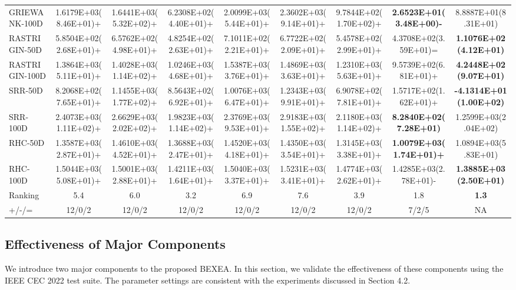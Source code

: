 \documentclass[review]{elsarticle}
\begin{document}
\begin{table}
{\begin{tabular}{lcccccccc}
GRIEWANK-100D & 1.6179E+03(8.46E+01)+ & 1.6441E+03(5.32E+02)+ & 6.2308E+02(4.40E+01)+ & 2.0099E+03(5.44E+01)+ & 2.3602E+03(9.14E+01)+ & 9.7844E+02(1.70E+02)+ & \textbf{2.6523E+01(3.48E+00)-} & 8.8887E+01(8.31E+01) \\
RASTRIGIN-50D & 5.8504E+02(2.68E+01)+ & 6.5762E+02(4.98E+01)+ & 4.8254E+02(2.63E+01)+ & 7.1011E+02(2.21E+01)+ & 6.7722E+02(2.09E+01)+ & 5.4578E+02(2.99E+01)+ & 4.3708E+02(3.59E+01)= & \textbf{1.1076E+02(4.12E+01)} \\
RASTRIGIN-100D & 1.3864E+03(5.11E+01)+ & 1.4028E+03(1.14E+02)+ & 1.0246E+03(4.68E+01)+ & 1.5387E+03(3.76E+01)+ & 1.4869E+03(3.63E+01)+ & 1.2310E+03(5.63E+01)+ & 9.5739E+02(6.81E+01)+ & \textbf{4.2448E+02(9.07E+01)} \\
SRR-50D & 8.2068E+02(7.65E+01)+ & 1.1455E+03(1.77E+02)+ & 8.5643E+02(6.92E+01)+ & 1.0076E+03(6.47E+01)+ & 1.2343E+03(9.91E+01)+ & 6.9078E+02(7.81E+01)+ & 1.5717E+02(1.62E+01)+ & \textbf{-4.1314E+01(1.00E+02)} \\
SRR-100D & 2.4073E+03(1.11E+02)+ & 2.6629E+03(2.02E+02)+ & 1.9823E+03(1.14E+02)+ & 2.3769E+03(9.53E+01)+ & 2.9183E+03(1.55E+02)+ & 2.1180E+03(1.14E+02)+ & \textbf{8.2840E+02(7.28E+01)} & 1.2599E+03(2.04E+02) \\
RHC-50D & 1.3587E+03(2.87E+01)+ & 1.4610E+03(4.52E+01)+ & 1.3688E+03(2.47E+01)+ & 1.4520E+03(4.18E+01)+ & 1.4350E+03(3.54E+01)+ & 1.3145E+03(3.38E+01)+ & \textbf{1.0079E+03(1.74E+01)+} & 1.0894E+03(5.83E+01) \\
RHC-100D & 1.5044E+03(5.08E+01)+ & 1.5001E+03(2.88E+01)+ & 1.4211E+03(1.64E+01)+ & 1.5040E+03(3.37E+01)+ & 1.5231E+03(3.41E+01)+ & 1.4774E+03(2.62E+01)+ & 1.4285E+03(2.78E+01)- & \textbf{1.3885E+03(2.50E+01)} \\
Ranking & 5.4 & 6.0 & 3.2 & 6.9 & 7.6 & 3.9 & 1.8 & \textbf{1.3} \\
+/-/= & 12/0/2 & 12/0/2 & 12/0/2 & 12/0/2 & 12/0/2 & 12/0/2 & 7/2/5 & NA \\
\bottomrule
\end{tabular}}
\end{table}

\subsection{Effectiveness of Major Components}
We introduce two major components to the proposed BEXEA. In this section, we validate the effectiveness of these components using the IEEE CEC 2022 test suite. The parameter settings are consistent with the experiments discussed in Section 4.2.
\end{document}
